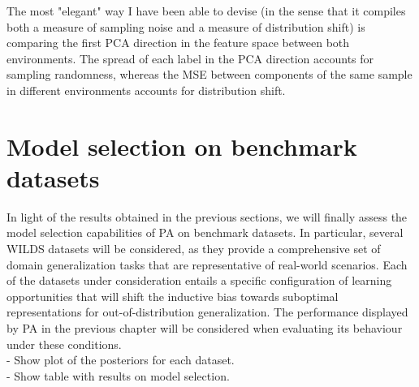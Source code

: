  The most "elegant" way I have been able to devise (in the sense that it compiles both a measure of sampling noise and a measure of distribution shift) is comparing the first PCA direction in the feature space between both environments. The spread of each label in the PCA direction accounts for sampling randomness, whereas the MSE between components of the same sample in different environments accounts for distribution shift.

 \section{Model selection on benchmark datasets}

In light of the results obtained in the previous sections, we will finally assess the model selection
capabilities of PA on benchmark datasets. In particular, several WILDS 
\cite{kohWILDSBenchmarkIntheWild2021} datasets will be considered, as they provide a comprehensive
set of domain generalization tasks that are representative of real-world scenarios. Each of the
datasets under consideration entails a specific configuration of learning opportunities that will
shift the inductive bias towards suboptimal representations for out-of-distribution
generalization. The performance displayed by PA in the previous chapter will be considered when
evaluating its behaviour under these conditions.\\


 - Show plot of the posteriors for each dataset. \\
 - Show table with results on model selection. \\

 \cleardoublepage